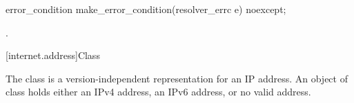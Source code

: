 %
%
\begin{itemdecl}
error_condition make_error_condition(resolver_errc e) noexcept;
\end{itemdecl}

\begin{itemdescr}
\pnum
\returns {}.
\end{itemdescr}



[internet.address]{Class }

\pnum
The class  is a version-independent representation for an IP address. An object of class  holds either an IPv4 address, an IPv6 address, or no valid address.

